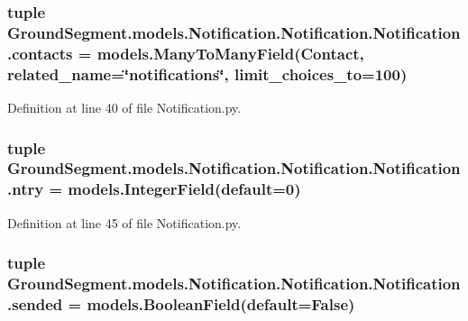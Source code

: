 \subsubsection[{contacts}]{\setlength{\rightskip}{0pt plus 5cm}tuple Ground\+Segment.\+models.\+Notification.\+Notification.\+Notification.\+contacts = models.\+Many\+To\+Many\+Field({\bf Contact}, related\+\_\+name=\char`\"{}notifications\char`\"{}, limit\+\_\+choices\+\_\+to=100)\hspace{0.3cm}{\ttfamily [static]}}\label{class_ground_segment_1_1models_1_1_notification_1_1_notification_1_1_notification_a1c85d3bd1dfb69b866c0b0023dd8bc6f}


Definition at line 40 of file Notification.\+py.

\hypertarget{class_ground_segment_1_1models_1_1_notification_1_1_notification_1_1_notification_a12664635efcb42cc8aef3d64c43b24d9}{}
\subsubsection[{ntry}]{\setlength{\rightskip}{0pt plus 5cm}tuple Ground\+Segment.\+models.\+Notification.\+Notification.\+Notification.\+ntry = models.\+Integer\+Field(default=0)\hspace{0.3cm}{\ttfamily [static]}}\label{class_ground_segment_1_1models_1_1_notification_1_1_notification_1_1_notification_a12664635efcb42cc8aef3d64c43b24d9}


Definition at line 45 of file Notification.\+py.

\hypertarget{class_ground_segment_1_1models_1_1_notification_1_1_notification_1_1_notification_aec220ade3819946a0fb450d03e5ef97c}{}
\subsubsection[{sended}]{\setlength{\rightskip}{0pt plus 5cm}tuple Ground\+Segment.\+models.\+Notification.\+Notification.\+Notification.\+sended = models.\+Boolean\+Field(default=False)\hspace{0.3cm}{\ttfamily [static]}}\label{class_ground_segment_1_1models_1_1_notification_1_1_notification_1_1_notification_aec220ade3819946a0fb450d03e5ef97c}


